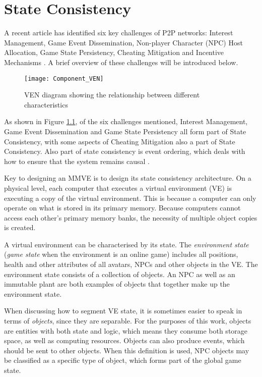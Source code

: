 \chapter{State Consistency}
\label{chp:CONSISTENCY}

A recent article has identified six key challenges of P2P networks: Interest Management, Game Event Dissemination, Non-player Character (NPC) Host
Allocation, Game State Persistency, Cheating Mitigation and Incentive Mechanisms \cite{Fan_deisgn_issues_p2p}. A brief overview of these challenges
will be introduced below.

\begin{figure}[htbp]
 \centering
 \texttt{[image: Component\_VEN]}
 \caption{VEN diagram showing the relationship between different characteristics}
 \label{fig_component_ven}
\end{figure}
%
As shown in Figure \ref{fig_component_ven}, of the six challenges mentioned, Interest Management, Game Event Dissemination and Game State Persistency
all form part of State Consistency, with some aspects of Cheating Mitigation also a part of State Consistency. Also part of state consistency is
event ordering, which deals with how to ensure that the system remains causal \cite{GauthierDickey_low_latency_event_ordering}.

Key to designing an MMVE is to design its state consistency architecture. On a physical level, each computer that executes a virtual environment (VE) is executing a copy of the virtual environment. This is because a computer can only operate on what is stored in its primary memory. Because computers cannot access each other's primary memory banks, the necessity of multiple object copies is created.

A virtual environment can be characterised by its state. The \emph{environment state} (\emph{game state} when the environment is an online game) includes all positions, health and other attributes of all avatars, NPCs and other objects in the VE. The environment state consists of a collection of objects. An NPC as well as an immutable plant are both examples of objects that together make up the environment state.

When discussing how to segment VE state, it is sometimes easier to speak in terms of \emph{objects}, since they are separable. For the purposes of this work, objects are entities with both state and logic, which means they consume both storage space, as well as computing resources. Objects can also produce events, which should be sent to other objects. When this definition is used, NPC objects may be classified as a specific type of object, which forms part of the global game state.

